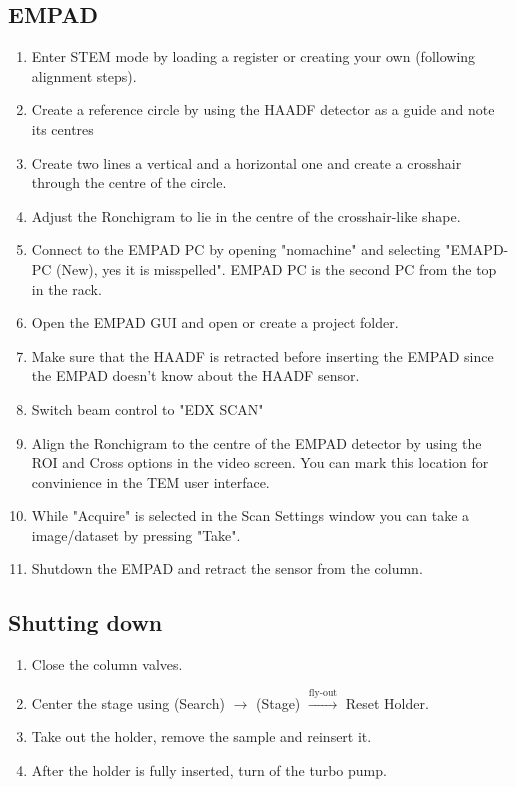 \documentclass[a4paper]{scrartcl}
\begin{document}
\subsection*{EMPAD}
\begin{enumerate}
	\item Enter STEM mode by loading a register or creating your own (following alignment steps).
	\item Create a reference circle by using the HAADF detector as a guide and note its centres
	\item Create two lines a vertical and a horizontal one and create a crosshair through the centre of the circle.
	\item Adjust the Ronchigram to lie in the centre of the crosshair-like shape.
	\item Connect to the EMPAD PC by opening "nomachine" and selecting "EMAPD-PC (New), yes it is misspelled". EMPAD PC is the second PC from the top in the rack.
	\item Open the EMPAD GUI and open or create a project folder.
	\item Make sure that the HAADF is retracted before inserting the EMPAD since the EMPAD doesn't know about the HAADF sensor.
	\item Switch beam control to "EDX SCAN"
	\item Align the Ronchigram to the centre of the EMPAD detector by using the ROI and Cross options in the video screen. You can mark this location for convinience in the TEM user interface.
	\item While "Acquire" is selected in the Scan Settings window you can take a image/dataset by pressing "Take".
	\item Shutdown the EMPAD and retract the sensor from the column.
\end{enumerate}

\subsection*{Shutting down}
\begin{enumerate}
	\item Close the column valves.
	\item Center the stage using (Search) $\rightarrow$ (Stage) $\xrightarrow{\text{fly-out}}$ Reset Holder.
	\item Take out the holder, remove the sample and reinsert it.
	\item After the holder is fully inserted, turn of the turbo pump.
\end{enumerate}
\end{document}
